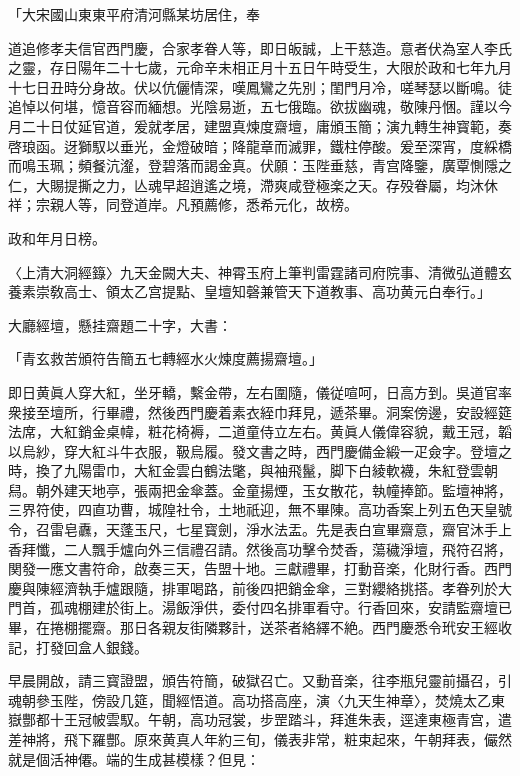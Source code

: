 \begin{myquote}[\markfont]
「大宋國山東東平府清河縣某坊居住，奉

道追修孝夫信官西門慶，合家孝眷人等，即日皈誠，上干慈造。意者伏為室人李氏之靈，存日陽年二十七歲，元命辛未相正月十五日午時受生，大限於政和七年九月十七日丑時分身故。伏以伉儷情深，嘆鳳鸞之先別；閨門月冷，嗟琴瑟以斷鳴。徒追悼以何堪，憶音容而緬想。光陰易逝，五七俄臨。欲拔幽魂，敬陳丹悃。謹以今月二十日仗延官道，爰就孝居，建盟真煉度齋壇，庸頒玉簡；演九轉生神寳範，奏啓琅函。迓獅馭以垂光，金燈破暗；降龍章而滅罪，鐵柱停酸。爰至深宵，度綵橋而鳴玉珮；頻餐沆瀣，登碧落而謁金真。伏願：玉陛垂慈，青宫降鑒，廣覃惻隱之仁，大賜提撕之力，亾魂早超逍遙之境，滯爽咸登極楽之天。存殁眷屬，均沐休祥；宗親人等，同登道岸。凡預薦修，悉希元化，故榜。　

政和年月日榜。

〈上清大洞經籙〉九天金闕大夫、神霄玉府上筆判雷霆諸司府院事、清微弘道體玄養素崇敎高士、領太乙宫提點、皇壇知磬兼管天下道教事、高功黄元白奉行。」
\end{myquote}

大廳經壇，懸挂齋題二十字，大書：

\begin{myquote}[\markfont]
「青玄救苦頒符告簡五七轉經水火煉度薦揚齋壇。」
\end{myquote}

即日黄眞人穿大紅，坐牙轎，繫金帶，左右圍隨，儀従喧呵，日高方到。吳道官率衆接至壇所，行畢禮，然後西門慶着素衣絰巾拜見，遞茶畢。洞案傍邊，安設經筵法席，大紅銷金桌幃，粧花椅褥，二道童侍立左右。黄眞人儀偉容貌，戴王冠，韜以烏紗，穿大紅斗牛衣服，靸烏履。發文書之時，西門慶備金緞一疋僉字。登壇之時，換了九陽雷巾，大紅金雲白鶴法氅，與袖飛鬣，脚下白綾軟襪，朱紅登雲朝舄。朝外建天地亭，張兩把金傘蓋。金童揚煙，玉女散花，執幢捧節。監壇神將，三界符使，四直功曹，城隍社令，土地祇迎，無不畢陳。高功香案上列五色天皇號令，召雷皂纛，天蓬玉尺，七星寳劍，淨水法盂。先是表白宣畢齋意，齋官沐手上香拜懺，二人飄手爐向外三信禮召請。然後高功擊令焚香，蕩穢淨壇，飛符召將，関發一應文書符命，啟奏三天，告盟十地。三獻禮畢，打動音楽，化財行香。西門慶與陳經濟執手爐跟隨，排軍喝路，前後四把銷金傘，三對纓絡挑搭。孝眷列於大門首，孤魂棚建於街上。湯飯淨供，委付四名排軍看守。行香回來，安請監齋壇已畢，在捲棚擺齋。那日各親友街隣夥計，送茶者絡繹不絶。西門慶悉令玳安王經收記，打發回盒人銀錢。

早晨開啟，請三寳證盟，頒告符簡，破獄召亡。又動音楽，往李瓶兒靈前攝召，引魂朝參玉陛，傍設几筵，聞經悟道。高功搭高座，演〈九天生神章〉，焚燒太乙東嶽酆都十王冠帔雲馭。午朝，高功冠裳，步罡踏斗，拜進朱表，逕達東極青宫，遣差神將，飛下羅酆。原來黄真人年約三旬，儀表非常，粧束起來，午朝拜表，儼然就是個活神僊。端的生成甚模樣？但見：

